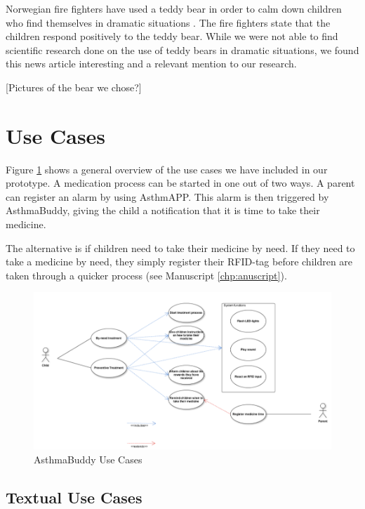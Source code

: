 Norwegian fire fighters have used a teddy bear in order to calm down children who find themselves in dramatic situations . The fire fighters state that the children respond positively to the teddy bear. 
While we were not able to find scientific research done on the use of teddy bears in dramatic situations, we found this news article interesting and a relevant mention to our research.

[Pictures of the bear we chose?]
 

\section{Use Cases}
Figure \ref{fig:pi-use-cases} shows a general overview of the use cases we have included in our prototype. A medication process can be started in one out of two ways. 
A parent can register an alarm by using AsthmAPP. This alarm is then triggered by AsthmaBuddy, giving the child a notification that it is time to take their medicine.

The alternative is if children need to take their medicine by need. If they need to take a medicine by need, they simply register their RFID-tag before children are taken through a quicker process (see Manuscript \ref{chp:anuscript}).  

\begin{figure}[H] 
	\centering
		\includegraphics[width=0.8\paperwidth]{Pictures/usecases.png}
	\caption{AsthmaBuddy Use Cases}
	\label{fig:pi-use-cases}
\end{figure}

\subsection{Textual Use Cases}


